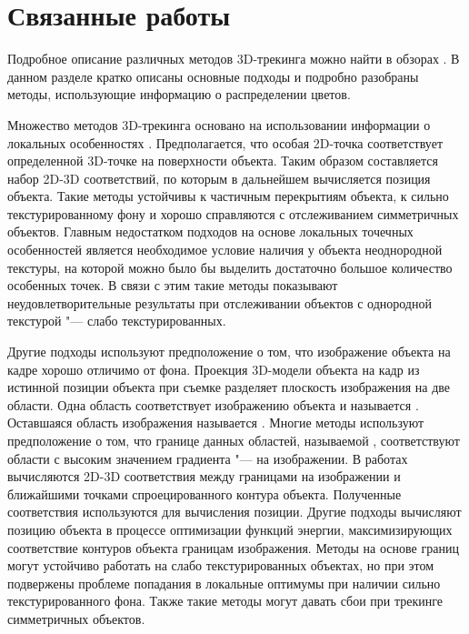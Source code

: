 \section{Связанные работы}\label{related-work}

Подробное описание различных методов 3D-трекинга можно найти в обзорах
\cite{LepetitSurvey,MarchandSurvey}.
В данном разделе кратко описаны основные подходы и подробно разобраны методы,
использующие информацию о распределении цветов.

Множество методов 3D-трекинга
\cite{Hinterstoisser2007,Vacchetti2004,Lourakis2013,Pauwels2013}
основано на использовании информации о локальных
особенностях \cite{AKAZE,SIFT,ShiAndTomasi,TomasiAndKanade,SIFT,PyrLK}.
Предполагается, что особая 2D-точка соответствует определенной
3D-точке на поверхности объекта.
Таким образом составляется набор 2D-3D соответствий, по которым в дальнейшем
вычисляется позиция объекта\cite{EPnP}.
Такие методы устойчивы к частичным перекрытиям объекта, к сильно
текстурированному фону и хорошо справляются с отслеживанием симметричных
объектов.
Главным недостатком подходов на основе локальных точечных особенностей является
необходимое условие наличия у объекта неоднородной текстуры, на которой можно
было бы выделить достаточно большое количество особенных точек.
В связи с этим такие методы показывают неудовлетворительные результаты при
отслеживании объектов с однородной текстурой "--- слабо текстурированных.

Другие подходы используют предположение о том, что изображение объекта на кадре
хорошо отличимо от фона.
Проекция 3D-модели объекта на кадр из истинной позиции объекта при съемке
разделяет плоскость изображения на две области.
Одна область соответствует изображению объекта и называется .
Оставшаяся область изображения называется .
Многие методы используют предположение о том, что границе данных областей,
называемой , соответствуют области с высоким значением
градиента "---  на изображении\cite{EdgesSurvey,CANNY}.
В работах
\cite{RAPID,Marchand2003,Choi2012,Marchand2006,Klein2006,SeoHinterstoisser2014,WangZhong2015,Damen2012,VacchettiEdges2004}
вычисляются 2D-3D соответствия между границами на изображении и ближайшими
точками спроецированного контура объекта.
Полученные соответствия используются для вычисления позиции.
Другие подходы \cite{WangZhong2017,Marchand2001,Bugaev_2018_ECCV} вычисляют
позицию объекта в процессе оптимизации функций энергии, максимизирующих
соответствие контуров объекта границам изображения.
Методы на основе границ могут устойчиво работать на слабо текстурированных
объектах, но при этом подвержены проблеме попадания в локальные оптимумы
при наличии сильно текстурированного фона.
Также такие методы могут давать сбои при трекинге симметричных объектов.

